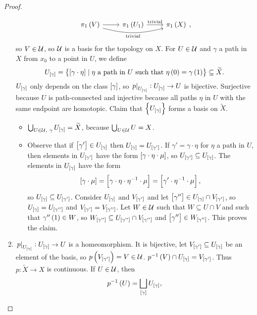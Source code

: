 \begin{proof}
\begin{enumerate}
$$\begin{tikzcd}
\pi_1\br{V} \arrow{r} \arrow[bend right=15, swap]{rr}{\text{trivial}} & \pi_1\br{U_1} \arrow{r}{\text{trivial}} & \pi_1\br{X}
\end{tikzcd},
$$
so $ V \in \mathcal{U} $, so $ \mathcal{U} $ is a basis for the topology on $ X $. For $ U \in \mathcal{U} $ and $ \gamma $ a path in $ X $ from $ x_0 $ to a point in $ U $, we define
$$ U_{\sbr{\gamma}} = \cbr{\sbr{\gamma \cdot \eta} \mid \eta \ \text{a path in} \ U \ \text{such that} \ \eta\br{0} = \gamma\br{1}} \subseteq \widetilde{X}. $$
$ U_{\sbr{\gamma}} $ only depends on the class $ \sbr{\gamma} $, so $ \eval{p}_{U_{\sbr{\gamma}}} : U_{\sbr{\gamma}} \to U $ is bijective. Surjective because $ U $ is path-connected and injective because all paths $ \eta $ in $ U $ with the same endpoint are homotopic. Claim that $ \cbr{U_{\sbr{\gamma}}} $ forms a basis on $ \widetilde{X} $.
\begin{itemize}
\item $ \bigcup_{U \in \UU, \ \gamma} U_{\sbr{\gamma}} = \widetilde{X} $, because $ \bigcup_{U \in \mathcal{U}} U = X $.
\item Observe that if $ \sbr{\gamma'} \in U_{\sbr{\gamma}} $ then $ U_{\sbr{\gamma}} = U_{\sbr{\gamma'}} $. If $ \gamma' = \gamma \cdot \eta $ for $ \eta $ a path in $ U $, then elements in $ U_{\sbr{\gamma'}} $ have the form $ \sbr{\gamma \cdot \eta \cdot \mu} $, so $ U_{\sbr{\gamma'}} \subseteq U_{\sbr{\gamma}} $. The elements in $ U_{\sbr{\gamma}} $ have the form
$$ \sbr{\gamma \cdot \mu} = \sbr{\gamma \cdot \eta \cdot \eta^{-1} \cdot \mu} = \sbr{\gamma' \cdot \eta^{-1} \cdot \mu}, $$
so $ U_{\sbr{\gamma}} \subseteq U_{\sbr{\gamma'}} $. Consider $ U_{\sbr{\gamma}} $ and $ V_{\sbr{\gamma'}} $ and let $ \sbr{\gamma''} \in U_{\sbr{\gamma}} \cap V_{\sbr{\gamma'}} $, so $ U_{\sbr{\gamma}} = U_{\sbr{\gamma''}} $ and $ V_{\sbr{\gamma'}} = V_{\sbr{\gamma''}} $. Let $ W \in \mathcal{U} $ such that $ W \subseteq U \cap V $ and such that $ \gamma''\br{1} \in W $, so $ W_{\sbr{\gamma''}} \subseteq U_{\sbr{\gamma''}} \cap V_{\sbr{\gamma''}} $ and $ \sbr{\gamma''} \in W_{\sbr{\gamma''}} $. This proves the claim.
\end{itemize}
\item $ \eval{p}_{U_{\sbr{\gamma}}} : U_{\sbr{\gamma}} \to U $ is a homeomorphism. It is bijective, let $ V_{\sbr{\gamma'}} \subseteq U_{\sbr{\gamma}} $ be an element of the basis, so $ p\br{V_{\sbr{\gamma'}}} = V \in \UU $. $ p^{-1}\br{V} \cap U_{\sbr{\gamma}} = V_{\sbr{\gamma'}} $. Thus $ p : \widetilde{X} \to X $ is continuous. If $ U \in \mathcal{U} $, then
$$ p^{-1}\br{U} = \bigsqcup_{\sbr{\gamma}} U_{\sbr{\gamma}}, $$

\end{enumerate}
\end{proof}
